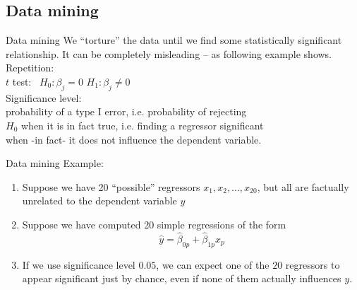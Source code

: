 \documentclass[usenames,dvipsnames]{beamer}
\begin{document}
\subsection{Data mining}
\begin{frame}{Data mining}
We ``torture'' the data until we find some statistically significant relationship. It can be completely misleading – as following example shows. \\
\bigskip
Repetition:  \\
\medskip
\qquad $t$ test: \ $H_0: \beta_j = 0$ \quad $H_1 : \beta_j \neq 0$ \\
\medskip
\qquad Significance level: \\
\qquad probability of a type I error, i.e. probability of rejecting \\ 
\qquad $H_0$ when it  is in fact true, i.e. finding a regressor significant \\ 
\qquad when -in fact- it does not influence the dependent variable.
\end{frame}
\begin{frame}{Data mining}
Example: 
\vspace{0.3cm}
\begin{enumerate}
\item Suppose we have 20 ``possible'' regressors $x_1, x_2, \dots, x_{20}$, but all are  factually unrelated to the dependent variable $y$
\vspace{0.3cm}
\item Suppose we have computed 20 simple regressions of the form
$$\hat{y} = \hat{\beta}_{0p} + \hat{\beta}_{1p} x_p$$

\vspace{0.3cm}
\item If we use significance level $0.05$, we can expect one of the $20$ regressors to appear significant just by chance, even if none of them actually influences $y$.
\end{enumerate}
\end{frame}
\end{document}
